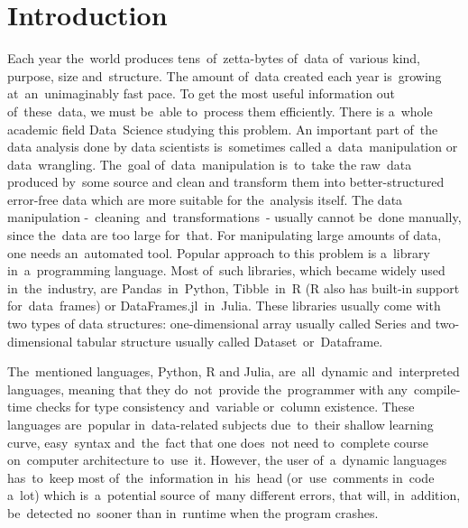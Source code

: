 \chapter*{Introduction}

Each year the~world produces tens~of~zetta-bytes of~data of~various kind, purpose, size and~structure.
The amount of~data created each year is~growing at~an~unimaginably fast pace.
To get the most useful information out of~these~data, we must be~able to~process them efficiently.
There is a~whole academic field Data~Science studying this problem.
An important part of~the data analysis done by data scientists is~sometimes called a~data~manipulation or data~wrangling.
The~goal of~data~manipulation is~to~take the raw~data produced by~some source and clean and transform them into
better-structured error-free data which are more suitable for the~analysis itself.
The data manipulation -~cleaning~and~transformations~- usually cannot be~done manually, since the~data are too large
for~that.
For manipulating large amounts of data, one needs an~automated tool.
Popular approach to this problem is a~library in~a~programming language.
Most of~such libraries, which became widely used in~the~industry, are Pandas~in~Python, Tibble~in~R (R also has built-in
support for~data~frames) or DataFrames.jl~in~Julia.
These libraries usually come with two types of data structures: one-dimensional array usually called Series
and two-dimensional tabular structure usually called Dataset~or~Dataframe.


The~mentioned languages, Python, R and Julia, are~all~dynamic and~interpreted languages, meaning that they do~not~provide
the~programmer with any~compile-time checks for type consistency and~variable or~column existence.
These languages are~popular in~data-related subjects due~to~their shallow learning curve, easy~syntax and~the~fact that
one does~not need to~complete course on~computer architecture to~use~it.
However, the user of~a~dynamic languages has~to~keep most of~the~information in~his~head (or~use~comments in~code a~lot)
which is~a~potential source of~many different errors, that will, in~addition, be~detected no~sooner than in~runtime when
the program crashes.

